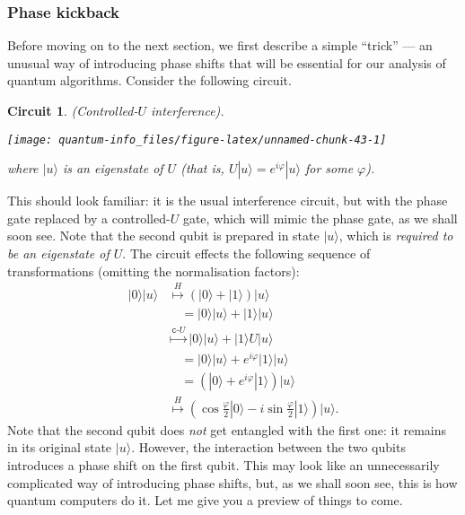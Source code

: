 \documentclass[fleqn]{article}
\newtheorem*{circuit}{Circuit}
\begin{document}
\hypertarget{phase-kickback}{%
\subsubsection{Phase kickback}\label{phase-kickback}}

Before moving on to the next section, we first describe a simple ``trick'' --- an unusual way of introducing phase shifts that will be essential for our analysis of quantum algorithms.
Consider the following circuit.

\begin{circuit}

(Controlled-\(U\) interference).

\begin{center}\texttt{[image: quantum-info\_files/figure-latex/unnamed-chunk-43-1]} \end{center}

where \(|u\rangle\) is an \emph{eigenstate} of \(U\) (that is, \(U|u\rangle = e^{i\varphi}|u\rangle\) for some \(\varphi\)).

\end{circuit}

This should look familiar: it is the usual interference circuit, but with the phase gate replaced by a controlled-\(U\) gate, which will mimic the phase gate, as we shall soon see.
Note that the second qubit is prepared in state \(|u\rangle\), which is \emph{required to be an eigenstate of \(U\)}.
The circuit effects the following sequence of transformations (omitting the normalisation factors):
\[
  \begin{aligned}
    |0\rangle|u\rangle
    &\overset{H}{\longmapsto}
    (|0\rangle+|1\rangle)|u\rangle
  \\&\quad = |0\rangle|u\rangle + |1\rangle|u\rangle
  \\&\overset{\texttt{c-}U}{\longmapsto}
    |0\rangle|u\rangle + |1\rangle U|u\rangle
  \\&\quad = |0\rangle|u\rangle + e^{i\varphi}|1\rangle|u\rangle
  \\&\quad = (|0\rangle + e^{i\varphi}|1\rangle) |u\rangle
  \\&\overset{H}{\longmapsto}
    \left(
      \cos\frac{\varphi}{2}|0\rangle
      - i\sin\frac{\varphi}{2}|1\rangle
    \right) |u\rangle.
  \end{aligned}
\]
Note that the second qubit does \emph{not} get entangled with the first one: it remains in its original state \(|u\rangle\).
However, the interaction between the two qubits introduces a phase shift on the first qubit.
This may look like an unnecessarily complicated way of introducing phase shifts, but, as we shall soon see, this is how quantum computers do it.
Let me give you a preview of things to come.
\end{document}
